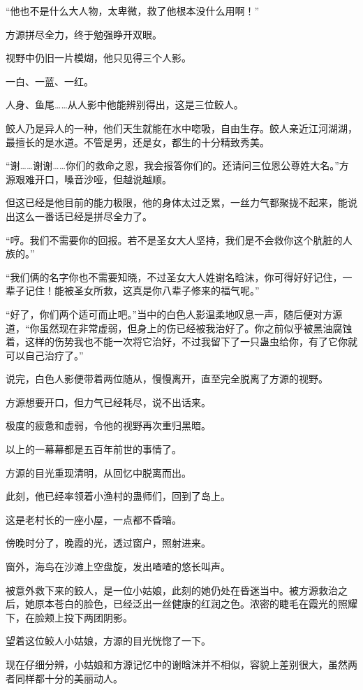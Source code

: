 \begin{this_body}
“他也不是什么大人物，太卑微，救了他根本没什么用啊！”

方源拼尽全力，终于勉强睁开双眼。

视野中仍旧一片模煳，他只见得三个人影。

一白、一蓝、一红。

人身、鱼尾……从人影中他能辨别得出，这是三位鲛人。

鲛人乃是异人的一种，他们天生就能在水中唿吸，自由生存。鲛人亲近江河湖湖，最擅长的是水道。不管是男，还是女，都生的十分精致秀美。

“谢……谢谢……你们的救命之恩，我会报答你们的。还请问三位恩公尊姓大名。”方源艰难开口，嗓音沙哑，但越说越顺。

但这已经是他目前的能力极限，他的身体太过乏累，一丝力气都聚拢不起来，能说出这么一番话已经是拼尽全力了。

“哼。我们不需要你的回报。若不是圣女大人坚持，我们是不会救你这个肮脏的人族的。”

“我们俩的名字你也不需要知晓，不过圣女大人姓谢名晗沫，你可得好好记住，一辈子记住！能被圣女所救，这真是你八辈子修来的福气呢。”

“好了，你们两个适可而止吧。”当中的白色人影温柔地叹息一声，随后便对方源道，“你虽然现在非常虚弱，但身上的伤已经被我治好了。你之前似乎被黑油腐蚀着，这样的伤势我也不能一次将它治好，不过我留下了一只蛊虫给你，有了它你就可以自己治疗了。”

说完，白色人影便带着两位随从，慢慢离开，直至完全脱离了方源的视野。

方源想要开口，但力气已经耗尽，说不出话来。

极度的疲惫和虚弱，令他的视野再次重归黑暗。

以上的一幕幕都是五百年前世的事情了。

方源的目光重现清明，从回忆中脱离而出。

此刻，他已经率领着小渔村的蛊师们，回到了岛上。

这是老村长的一座小屋，一点都不昏暗。

傍晚时分了，晚霞的光，透过窗户，照射进来。

窗外，海鸟在沙滩上空盘旋，发出喳喳的悠长叫声。

被意外救下来的鲛人，是一位小姑娘，此刻的她仍处在昏迷当中。被方源救治之后，她原本苍白的脸色，已经泛出一丝健康的红润之色。浓密的睫毛在霞光的照耀下，在脸颊上投下两团阴影。

望着这位鲛人小姑娘，方源的目光恍惚了一下。

现在仔细分辨，小姑娘和方源记忆中的谢晗沫并不相似，容貌上差别很大，虽然两者同样都十分的美丽动人。


\end{this_body}
